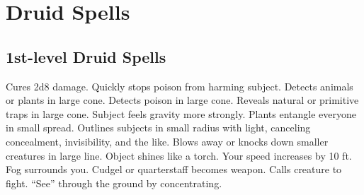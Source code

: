 \section{Druid Spells}

\subsection{1st-level Druid Spells}
\begin{spelllist}
   Cures 2d8 damage.
   Quickly stops poison from harming subject.
   Detects animals or plants in large cone.
   Detects poison in large cone.
   Reveals natural or primitive traps in large cone.
   Subject feels gravity more strongly.
   Plants entangle everyone in small spread.
   Outlines subjects in small radius with light, canceling concealment, invisibility, and the like.
   Blows away or knocks down smaller creatures in large line.
   Object shines like a torch.
   Your speed increases by 10 ft.
   Fog surrounds you.
   Cudgel or quarterstaff becomes  weapon.
   Calls creature to fight.
   ``See'' through the ground by concentrating.
\end{spelllist}

